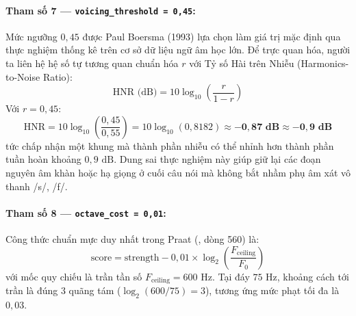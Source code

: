 \documentclass[11pt,a4paper]{article}
\begin{document}
\paragraph{Tham số 7 --- \texttt{voicing\_threshold = 0,45}:}
Mức ngưỡng $0{,}45$ được Paul Boersma (1993) lựa chọn làm giá trị mặc định qua thực nghiệm thống kê trên cơ sở dữ liệu ngữ âm học lớn. Để trực quan hóa, người ta liên hệ hệ số tự tương quan chuẩn hóa $r$ với Tỷ số Hài trên Nhiễu (Harmonics-to-Noise Ratio):
\begin{equation}
\text{HNR (dB)} = 10 \log_{10}\!\left(\frac{r}{1-r}\right)
\end{equation}
Với $r = 0{,}45$:
\[
\text{HNR} = 10 \log_{10}\left(\frac{0{,}45}{0{,}55}\right) = 10 \log_{10}(0{,}8182) \approx \mathbf{-0{,}87\text{ dB}} \approx \mathbf{-0{,}9\text{ dB}}
\]
tức chấp nhận một khung mà thành phần nhiễu có thể nhỉnh hơn thành phần tuần hoàn khoảng $0{,}9\text{ dB}$. Dung sai thực nghiệm này giúp giữ lại các đoạn nguyên âm khàn hoặc hạ giọng ở cuối câu nói mà không bắt nhầm phụ âm xát vô thanh /s/, /f/.

\paragraph{Tham số 8 --- \texttt{octave\_cost = 0,01}:}
Công thức chuẩn mực duy nhất trong Praat (, dòng 560) là:
\begin{equation}
\text{score} = \text{strength} - 0{,}01 \times \log_2\left(\frac{F_{\text{ceiling}}}{F_0}\right)
\label{eq:praat_octave_cost_exact}
\end{equation}
với mốc quy chiếu là trần tần số $F_{\text{ceiling}} = 600\text{ Hz}$. Tại đáy $75\text{ Hz}$, khoảng cách tới trần là đúng $3$ quãng tám ($\log_2(600/75) = 3$), tương ứng mức phạt tối đa là $0{,}03$.
\end{document}

